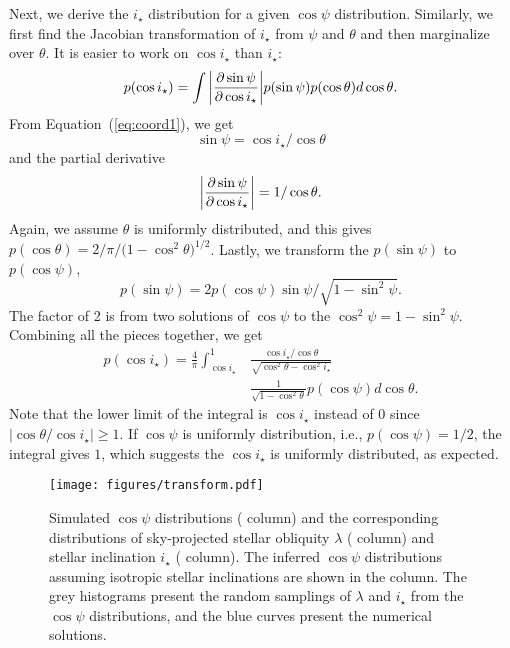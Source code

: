 \documentclass[twocolumn,times]{aastex631}
\begin{document}
Next, we derive the $i_\star$ distribution for a given $\cos{\psi}$ distribution. Similarly, we first find the Jacobian transformation of $i_\star$ from $\psi$ and $\theta$ and then marginalize over $\theta$. It is easier to work on $\cos{i_\star}$ than $i_\star$:
\begin{equation}
    p(\cos{i_\star}) = \int \abs{\pdv{\sin{\psi}}{\cos{i_\star}}} p(\sin{\psi}) p(\cos{\theta}) d\cos{\theta}.
\end{equation}
From Equation~(\ref{eq:coord1}), we get 
\begin{equation}
    \sin{\psi} = \cos{i_\star}/\cos{\theta}
\end{equation} and the partial derivative
\begin{equation}
    \abs{\pdv{\sin{\psi}}{\cos{i_\star}}} = 1/\cos{\theta}.
\end{equation} 
Again, we assume $\theta$ is uniformly distributed, and this gives $p(\cos{\theta}) = 2/\pi/(1-\cos^2{\theta)^{1/2}}$. Lastly, we transform the $p(\sin{\psi})$ to $p(\cos{\psi})$,
\begin{equation}
    p(\sin{\psi}) = 2p(\cos{\psi})\sin{\psi}/\sqrt{1-\sin^2{\psi}}.
\end{equation}
The factor of 2 is from two solutions of $\cos{\psi}$ to the $\cos^2{\psi} = 1-\sin^2{\psi}$. Combining all the pieces together, we get
\begin{align}\label{eqn:jac_istar}
    p(\cos{i_\star}) = \frac{4}{\pi} \int_{\cos{i_\star}}^{1}& \frac{\cos{i_\star}/\cos{\theta}}{\sqrt{\cos^2{\theta}-\cos^2{i_\star}}} \nonumber\\ 
    &\frac{1}{\sqrt{1-\cos^2{\theta}}} p(\cos{\psi}) d\cos{\theta}.
\end{align}
Note that the lower limit of the integral is $\cos{i_\star}$ instead of 0 since $\lvert \cos{\theta}/\cos{i_\star} \rvert \geqslant 1$.
If $\cos{\psi}$ is uniformly distribution, i.e., $p(\cos{\psi}) = 1/2$, the integral gives $1$, which suggests the $\cos{i_\star}$ is uniformly distributed, as expected.

\begin{figure*}[ht!]
    \centering
    \texttt{[image: figures/transform.pdf]}
    \caption{Simulated $\cos{\psi}$ distributions ( column) and the corresponding distributions of sky-projected stellar obliquity $\lambda$ ( column) and stellar inclination $i_\star$ ( column). The inferred $\cos{\psi}$ distributions assuming isotropic stellar inclinations are shown in the  column. The grey histograms present the random samplings of $\lambda$ and $i_\star$ from the $\cos{\psi}$ distributions, and the blue curves present the numerical solutions.}
    \label{fig:transform}
\end{figure*}
\end{document}
